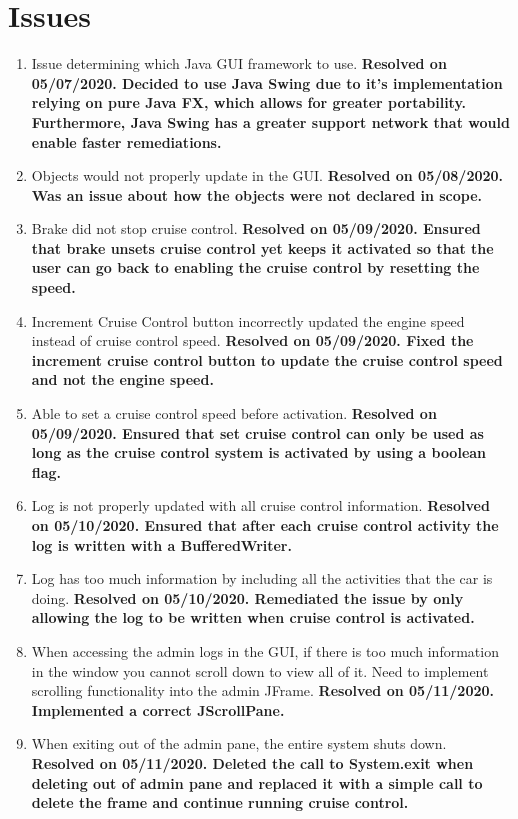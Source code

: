 \documentclass[preprint,11pt,3p]{article}
\begin{document}
\section{Issues}
\begin{enumerate} 
	\item Issue determining which Java GUI framework to use. \textbf{Resolved on 05/07/2020. Decided to use Java Swing due to it's implementation relying on pure Java FX, which allows for greater portability. Furthermore, Java Swing has a greater support network that would enable faster remediations.}
	\item Objects would not properly update in the GUI. \textbf{Resolved on 05/08/2020. Was an issue about how the objects were not declared in scope.}
	\item Brake did not stop cruise control. \textbf{Resolved on 05/09/2020. Ensured that brake unsets cruise control yet keeps it activated so that the user can go back to enabling the cruise control by resetting the speed.}
	\item Increment Cruise Control button incorrectly updated the engine speed instead of cruise control speed. \textbf{Resolved on 05/09/2020. Fixed the increment cruise control button to update the cruise control speed and not the engine speed.}
	\item Able to set a cruise control speed before activation. \textbf{Resolved on 05/09/2020. Ensured that set cruise control can only be used as long as the cruise control system is activated by using a boolean flag.}
	\item Log is not properly updated with all cruise control information. \textbf{Resolved on 05/10/2020. Ensured that after each cruise control activity the log is written with a BufferedWriter.}
	\item Log has too much information by including all the activities that the car is doing. \textbf{Resolved on 05/10/2020. Remediated the issue by only allowing the log to be written when cruise control is activated.}
	\item When accessing the admin logs in the GUI, if there is too much information in the window you cannot scroll down to view all of it. Need to implement scrolling functionality into the admin JFrame. \textbf{Resolved on 05/11/2020. Implemented a correct JScrollPane.} 
	\item When exiting out of the admin pane, the entire system shuts down. \textbf{Resolved on 05/11/2020. Deleted the call to System.exit when deleting out of admin pane and replaced it with a simple call to delete the frame and continue running cruise control.}

\end{enumerate}
\end{document}
